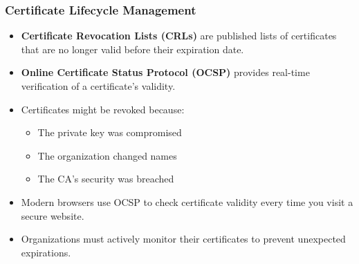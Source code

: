 \documentclass{beamer}
\begin{document}
\begin{frame}
    \frametitle{Certificate Lifecycle Management}
    
    \begin{itemize}
        \item \textbf{Certificate Revocation Lists (CRLs)} are published lists of certificates that are no longer valid before their expiration date.
        
        \item \textbf{Online Certificate Status Protocol (OCSP)} provides real-time verification of a certificate's validity.
        
        \item Certificates might be revoked because:
            \begin{itemize}
                \item The private key was compromised
                \item The organization changed names
                \item The CA's security was breached
            \end{itemize}
        
        \item Modern browsers use OCSP to check certificate validity every time you visit a secure website.
        
        \item Organizations must actively monitor their certificates to prevent unexpected expirations.
    \end{itemize}
\end{frame}
\end{document}

